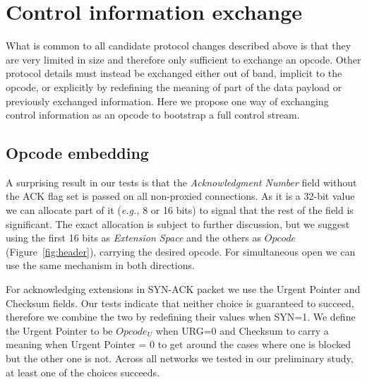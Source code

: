 \documentclass{sig-alternate-10pt}
\providecommand{\eg}{\emph{e.g.,} }
\begin{document}


\section{Control information exchange}
\label{sec:protocol}

What is common to all candidate protocol changes described above is that they are very limited in size and therefore only sufficient to exchange an opcode. Other protocol details must instead be exchanged either out of band, implicit to the opcode, or explicitly by redefining the meaning of part of the data payload or previously exchanged information. Here we propose one way of exchanging control information as an opcode to bootstrap a full control stream.

\subsection{Opcode embedding}

A surprising result in our tests is that the \emph{Acknowledgment Number} field without the ACK flag set is passed on all non-proxied connections. As it is a 32-bit value we can allocate part of it (\eg 8 or 16 bits) to signal that the rest of the field is significant. The exact allocation is subject to further discussion, but we suggest using the first 16 bits as \emph{Extension Space} and the others as $Opcode$ (Figure~\ref{fig:header}), carrying the desired opcode. For simultaneous open we can use the same mechanism in both directions.

For acknowledging extensions in SYN-ACK packet we use the Urgent Pointer and Checksum fields. Our tests indicate that neither choice is guaranteed to succeed, therefore we combine the two by redefining their values when SYN=1. We define the Urgent Pointer to be $Opcode_U$ when URG=0 and Checksum to carry a meaning when Urgent Pointer = 0 to get around the cases where one is blocked but the other one is not. Across all networks we tested in our preliminary study, at least one of the choices succeeds.
\end{document}
